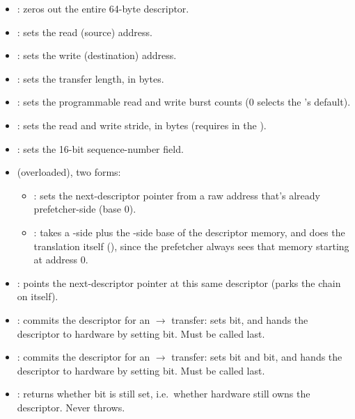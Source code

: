 \begin{itemize}
    \item {}: zeros out the entire 64-byte descriptor.
    \item {}: sets the read (source) address.
    \item {}: sets the write (destination) address.
    \item {}: sets the transfer length, in bytes.
    \item {}: sets the programmable read and write burst counts (0 selects the 's default).
    \item {}: sets the read and write stride, in bytes (requires  in the ).
    \item {}: sets the 16-bit sequence-number field.
    \item {} (overloaded), two forms:
    \begin{itemize}
        \item {}: sets the next-descriptor pointer from a raw address that's already prefetcher-side (base 0).
        \item {}: takes a -side  plus the -side base of the descriptor memory, and does the translation itself (), since the prefetcher always sees that memory starting at address 0.
    \end{itemize}
    \item {}: points the next-descriptor pointer at this same descriptor (parks the chain on itself).
    \item {}: commits the descriptor for an $\rightarrow$ transfer: sets  bit, and hands the descriptor to hardware by setting  bit. Must be called last.
    \item {}: commits the descriptor for an $\rightarrow$ transfer: sets  bit and  bit, and hands the descriptor to hardware by setting  bit. Must be called last.
    \item {}: returns whether  bit is still set, i.e.\ whether hardware still owns the descriptor. Never throws.

\end{itemize}
